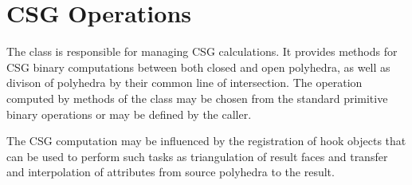 \documentclass{carve}
\begin{document}
\chapter{CSG Operations}

The  class is responsible for managing CSG
calculations. It provides methods for CSG binary computations between
both closed and open polyhedra, as well as divison of polyhedra by
their common line of intersection. The operation computed by methods
of the  class may be chosen from the standard
primitive binary operations or may be defined by the caller.

The CSG computation may be influenced by the registration of hook
objects that can be used to perform such tasks as triangulation of
result faces and transfer and interpolation of attributes from source
polyhedra to the result.
\end{document}
